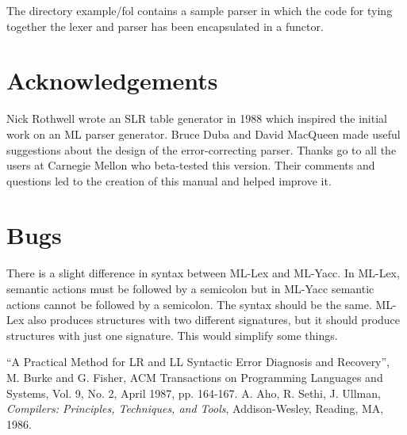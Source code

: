 The directory example/fol contains a sample parser in which
the code for tying together the lexer and parser has been
encapsulated in a functor.

\section{Acknowledgements}

Nick Rothwell wrote an SLR table generator in 1988 which inspired the
initial work on an ML parser generator.  Bruce Duba and David
MacQueen made useful suggestions about the design of the error-correcting
parser.  Thanks go to all the users at Carnegie Mellon who beta-tested
this version.  Their comments and questions led to the creation of
this manual and helped improve it.

\section{Bugs}

There is a slight difference in syntax between ML-Lex and ML-Yacc.
In ML-Lex, semantic actions must be followed by a semicolon but
in ML-Yacc semantic actions cannot be followed by a semicolon.
The syntax should be the same.  ML-Lex also produces structures with
two different signatures, but it should produce structures with just
one signature.  This would simplify some things.

\begin{thebibliography}{9}

 ``A Practical Method for LR and LL Syntactic Error
Diagnosis and Recovery'', M. Burke and G. Fisher,
ACM Transactions on Programming Languages and
Systems, Vol. 9, No. 2, April 1987, pp. 164-167.
 A. Aho, R. Sethi, J. Ullman, {\em Compilers: Principles,
Techniques, and Tools}, Addison-Wesley, Reading, MA, 1986.

\end{thebibliography}


